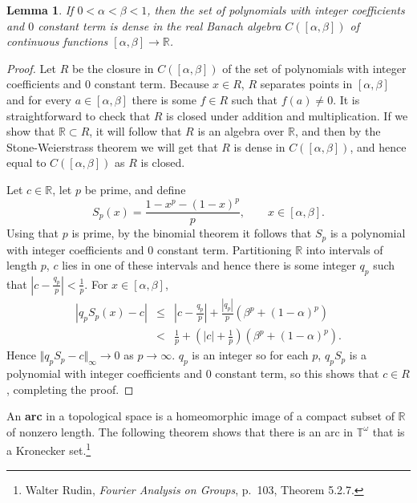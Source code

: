 \documentclass{article}
\newcommand{\norm}[1]{\Vert #1 \Vert}
\newtheorem{lemma}[theorem]{Lemma}
\begin{document}
\begin{lemma}
If $0<\alpha<\beta<1$, then
the set of polynomials with integer coefficients and $0$ constant term is dense in the real Banach algebra $C([\alpha,\beta])$ of continuous functions $[\alpha,\beta] \to 
\mathbb{R}$.
\label{integerpoly}
\end{lemma}
\begin{proof}
Let $R$ be the closure in $C([\alpha,\beta])$ of the set of polynomials with integer coefficients and $0$ constant term. Because $x \in R$, $R$ separates points
in $[\alpha,\beta]$ and  for every $a \in [\alpha,\beta]$ there is some $f \in R$ such that $f(a) \neq 0$. It is straightforward
to check that $R$ is closed under addition and multiplication. If we show that $\mathbb{R} \subset R$, it will follow that $R$ is an algebra over $\mathbb{R}$,
and then by the Stone-Weierstrass theorem we will get that $R$ is dense in $C([\alpha,\beta])$, and hence equal to $C([\alpha,\beta])$ as $R$ is closed.

Let $c \in \mathbb{R}$, let $p$ be prime, and define
\[
S_p(x) = \frac{1-x^p-(1-x)^p}{p}, \qquad x \in [\alpha,\beta].
\]
Using that $p$ is prime, by the binomial theorem it follows that $S_p$ is a polynomial with integer coefficients and $0$ constant term.
Partitioning $\mathbb{R}$ into intervals of length $p$, $c$ lies in one of these intervals and hence there is some integer $q_p$ such that
$\left|c-\frac{q_p}{p}\right|<\frac{1}{p}$. 
For $x \in [\alpha,\beta]$,
\begin{eqnarray*}
|q_p S_p(x)-c| &\leq& \left|c-\frac{q_p}{p}\right| +   \frac{|q_p|}{p} (\beta^p+(1-\alpha)^p)\\
& <& \frac{1}{p}+
\left(|c|+\frac{1}{p} \right)(\beta^p+(1-\alpha)^p).
\end{eqnarray*}
Hence $\norm{q_pS_p - c}_\infty \to 0$ as $p \to \infty$. $q_p$ is an integer so for each $p$, $q_pS_p$ is a polynomial with integer coefficients and $0$ constant term, so this shows
that $c \in R$, completing the proof.
\end{proof}

An \textbf{arc} in a topological space is a homeomorphic image of a  compact subset of $\mathbb{R}$ of nonzero length. The following theorem shows that
there is an arc in $\mathbb{T}^\omega$ that is a Kronecker set.\footnote{Walter Rudin, {\em Fourier Analysis on Groups}, p.~103, Theorem 5.2.7.}
\end{document}
